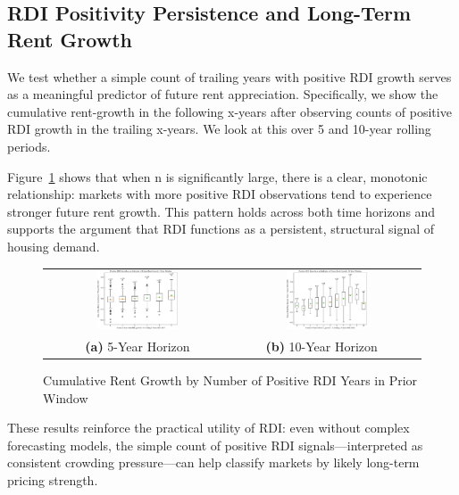 \documentclass[APA,Times1COL]{WileyNJDv5} %
\begin{document}
\subsection{RDI Positivity Persistence and Long-Term Rent Growth}
We test whether a simple count of trailing years with positive RDI growth serves as a meaningful predictor of future rent appreciation. Specifically, we show the cumulative rent-growth in the following x-years after observing counts of positive RDI growth in the trailing x-years. We look at this over 5 and 10-year rolling periods. 

Figure~\ref{fig:rdi-counts} shows that when n is significantly large, there is a clear, monotonic relationship: markets with more positive RDI observations tend to experience stronger future rent growth. This pattern holds across both time horizons and supports the argument that RDI functions as a persistent, structural signal of housing demand.

\begin{figure}[h]
	\centering
	\begin{tabular}{cc}
		\includegraphics[width=0.45\textwidth]{rdi_positive_counts_vs_rent_growth_5yr.pdf} &
		\includegraphics[width=0.45\textwidth]{rdi_positive_counts_vs_rent_growth_10yr.pdf} \\
		\textbf{(a)} 5-Year Horizon & \textbf{(b)} 10-Year Horizon \
	\end{tabular}
	\caption{Cumulative Rent Growth by Number of Positive RDI Years in Prior Window}
	\label{fig:rdi-counts}
\end{figure}

These results reinforce the practical utility of RDI: even without complex forecasting models, the simple count of positive RDI signals---interpreted as consistent crowding pressure---can help classify markets by likely long-term pricing strength.
\end{document}
